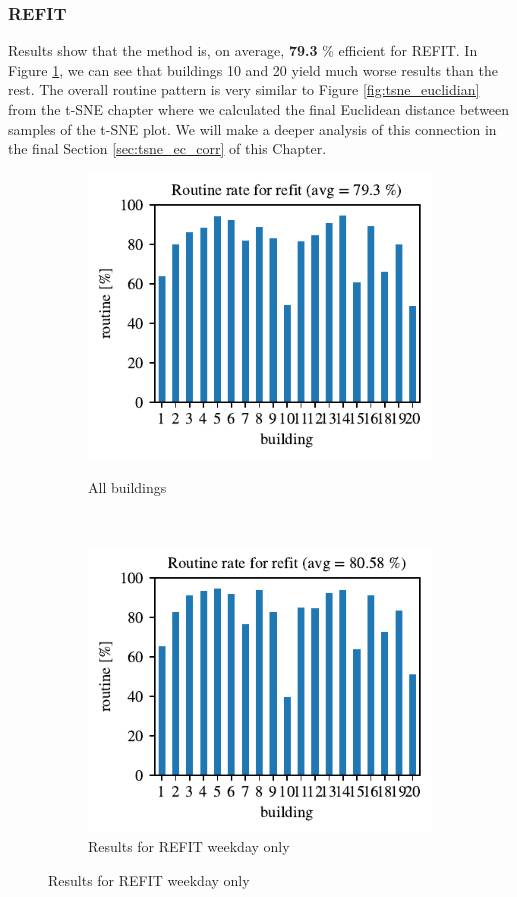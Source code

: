 \subsubsection{REFIT}

Results show that the method is, on average, \textbf{79.3} \% efficient for REFIT.  
In Figure \ref{fig:refit_res}, we can see that buildings 10 and 20 yield much worse results than the rest.
The overall routine pattern is very similar to Figure \ref{fig:tsne_euclidian} from the t-SNE chapter where we calculated the final Euclidean distance between samples of the t-SNE plot.
We will make a deeper analysis of this connection in the final Section \ref{sec:tsne_ec_corr} of this Chapter.

\begin{figure}[H]
	\begin{subfigure}{.5\textwidth}
        \caption{All buildings}
        \includegraphics[width=1\textwidth]{Figures/EC/refit_res.pdf}
        \label{fig:refit_res}
    \end{subfigure}
    ~
    \begin{subfigure}{.5\textwidth}
        \caption{Results for REFIT weekday only}
        \includegraphics[width=1\textwidth]{Figures/EC/refit_res_nw_1.pdf}

\end{subfigure}
\end{figure}
